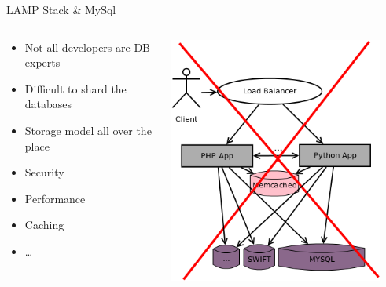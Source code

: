 \documentclass[aspectratio=169]{beamer}
\begin{document}
\begin{frame}{LAMP Stack \& MySql}
    \begin{columns}
        \begin{column}[c]{0.5\textwidth}
            \begin{itemize}
                \item Not all developers are DB experts
                \item Difficult to shard the databases
                \item Storage model all over the place
                \item Security
                \item Performance
                \item Caching
                \item \dots
            \end{itemize}
        \end{column}
        \begin{column}[c]{0.5\textwidth}
            \includegraphics[width=0.9\textwidth]{images/oldstorageusage.png}
        \end{column}
    \end{columns}
\end{frame}
\end{document}
